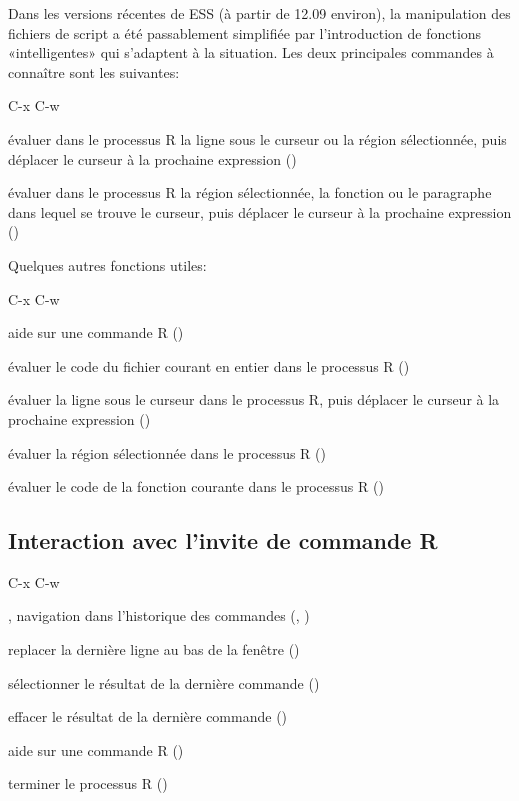 Dans les versions récentes de ESS (à partir de 12.09 environ), la
manipulation des fichiers de script a été passablement simplifiée par
l'introduction de fonctions «intelligentes» qui s'adaptent à la
situation. Les deux principales commandes à connaître sont les
suivantes:

\begin{ttscript}{C-x C-w}
  \raggedright
\item[\ess{C-RET}] évaluer dans le processus R la ligne sous le
  curseur ou la région sélectionnée, puis déplacer le curseur à la
  prochaine expression ()
\item[\ess{C-c C-c}] évaluer dans le processus R la région sélectionnée, la
  fonction ou le paragraphe dans lequel se trouve le curseur, puis
  déplacer le curseur à la prochaine expression
  ()
\end{ttscript}
Quelques autres fonctions utiles:
\begin{ttscript}{C-x C-w}
  \raggedright
\item[\ess{C-c C-v}] aide sur une commande R
  ()
\item[\ess{C-c C-l}] évaluer le code du fichier courant en entier dans
  le processus R ()
\item[\ess{C-c C-n}] évaluer la ligne sous le curseur dans le
  processus R, puis déplacer le curseur à la prochaine expression
  ()
\item[\ess{C-c C-r}] évaluer la région sélectionnée dans le processus
  R ()
\item[\ess{C-c C-f}] évaluer le code de la fonction courante dans
  le processus R ()
\end{ttscript}

\subsection{Interaction avec l'invite de commande R}
\label{emacs+ess:commandes:invite}

\begin{ttscript}{C-x C-w}
  \raggedright
\item[\ess{M-p}, \ess{M-n}] navigation dans l'historique des
  commandes (,
  )
\item[\ess{C-c C-e}] replacer la dernière ligne au bas de la fenêtre
  ()
\item[\ess{M-h}] sélectionner le résultat de la dernière commande
  ()
\item[\ess{C-c C-o}] effacer le résultat de la dernière commande
  ()
\item[\ess{C-c C-v}] aide sur une commande R
  ()
\item[\ess{C-c C-q}] terminer le processus R ()
\end{ttscript}

